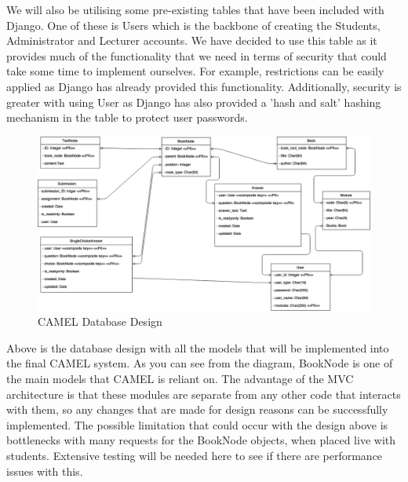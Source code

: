 	We will also be utilising some pre-existing tables that have been included with Django. One of these is Users which is the backbone of creating the Students, Administrator and Lecturer accounts. We have decided to use this table as it provides much of the functionality that we need in terms of security that could take some time to implement ourselves. For example, restrictions can be easily applied as Django has already provided this functionality. Additionally, security is greater with using User as Django has also provided a 'hash and salt' hashing mechanism in the table to protect user passwords.\\	
	
	\begin{figure}[h]
		\includegraphics[scale=0.45]{implementation/img/database_design}
		\caption{CAMEL Database Design}
	\end{figure}
	
	Above is the database design with all the models that will be implemented into the final CAMEL system. As you can see from the diagram, BookNode is one of the main models that CAMEL is reliant on. The advantage of the MVC architecture is that these modules are separate from any other code that interacts with them, so any changes that are made for design reasons can be successfully implemented. The possible limitation that could occur with the design above is bottlenecks with many requests for the BookNode objects, when placed live with students. Extensive testing will be needed here to see if there are performance issues with this.\\